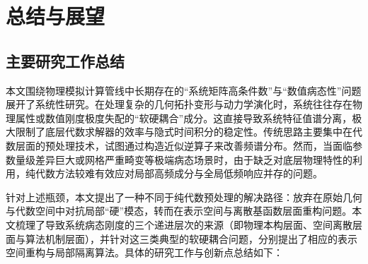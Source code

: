 
\chapter{总结与展望}

\section{主要研究工作总结}
本文围绕物理模拟计算管线中长期存在的“系统矩阵高条件数”与“数值病态性”问题展开了系统性研究。在处理复杂的几何拓扑变形与动力学演化时，系统往往存在物理属性或数值刚度极度失配的“软硬耦合”成分。这直接导致系统特征值谱分离，极大限制了底层代数求解器的效率与隐式时间积分的稳定性。传统思路主要集中在代数层面的预处理技术，试图通过构造近似逆算子来改善频谱分布。然而，当面临参数量级差异巨大或网格严重畸变等极端病态场景时，由于缺乏对底层物理特性的利用，纯代数方法较难有效应对局部高频成分与全局低频响应并存的问题。

针对上述瓶颈，本文提出了一种不同于纯代数预处理的解决路径：放弃在原始几何与代数空间中对抗局部“硬”模态，转而在表示空间与离散基函数层面重构问题。本文梳理了导致系统病态刚度的三个递进层次的来源（即物理本构层面、空间离散层面与算法机制层面），并针对这三类典型的软硬耦合问题，分别提出了相应的表示空间重构与局部隔离算法。具体的研究工作与创新点总结如下：

